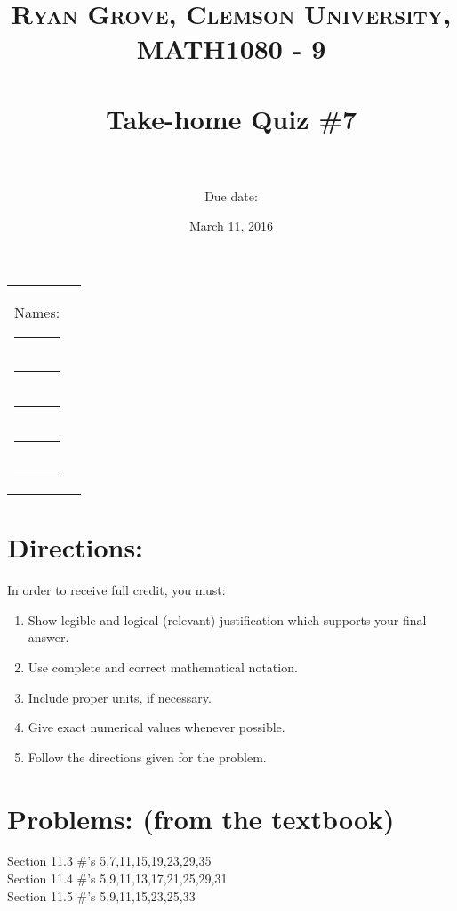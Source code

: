 \documentclass[paper=a4, fontsize=11pt]{scrartcl} %
\title{	
\normalfont \normalsize 
\textsc{Ryan Grove, Clemson University, MATH1080 - 9} \\ [25pt] %
\horrule{0.5pt} \\[0.4cm] %
\huge Take-home Quiz \#7 \\ %
\horrule{2pt} \\[0.5cm] %
}
\author{Due date:} %
\date{\normalsize March 11, 2016} %
\numberwithin{equation}{section} %
\numberwithin{figure}{section} %
\numberwithin{table}{section} %
\begin{document}
\maketitle %

\begin{flushleft}
\begin{tabular}{l l}
Names: \rule{3.2in}{.01cm}  & {}\\%
\hspace{.5in} \rule{3.2in}{.01cm}\\
\hspace{.5in} \rule{3.2in}{.01cm}\\
\hspace{.5in} \rule{3.2in}{.01cm}\\
\hspace{.5in} \rule{3.2in}{.01cm}\\
\end{tabular}
\end{flushleft}


\section*{\textbf{Directions:}}

In order to receive full credit, you must:
\begin{enumerate}
\item Show legible and logical (relevant) justification which supports your final answer.
\item Use complete and correct mathematical notation.
\item Include proper units, if necessary.
\item Give exact numerical values whenever possible.
\item Follow the directions given for the problem.
\end{enumerate}
\vspace{.1in}


\section*{\textbf{Problems:} (from the textbook)} 
Section 11.3 \#'s 5,7,11,15,19,23,29,35\\
Section 11.4 \#'s 5,9,11,13,17,21,25,29,31\\
Section 11.5 \#'s 5,9,11,15,23,25,33\\

\end{document}
